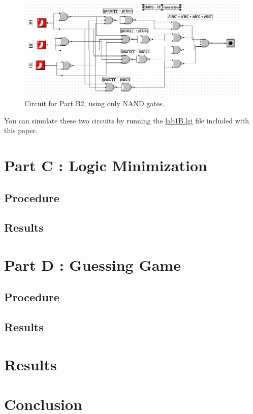 \documentclass[a4paper,11pt]{article}
\begin{document}
\begin{figure}[h!]
   \centering
     \includegraphics[width=6.5in]{PartB2}
   \caption{Circuit for Part B2, using only NAND gates.}
   \label{fig:b2circuit}
\end{figure}   
\par

You can simulate these two circuits by running the \url{lab1B.lgi} file included with this paper.



\section{Part C : Logic Minimization}
\subsection{Procedure}
\subsection{Results}



\section{Part D : Guessing Game}
\subsection{Procedure}
\subsection{Results}
\section{Results}



\section{Conclusion}
\end{document}

